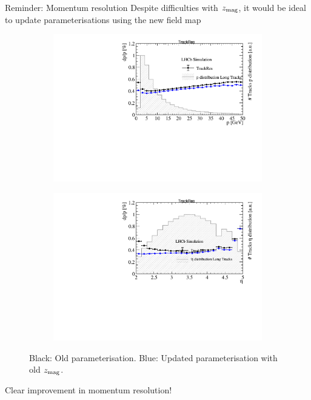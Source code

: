 \documentclass[xcolor={dvipsnames}]{beamer}
\begin{document}
\begin{frame}{Reminder: Momentum resolution}
  \vspace{0.0cm}
  {\Large Despite difficulties with $z_{\rm mag}$, it would be ideal to update parameterisations using the new field map}
  \begin{figure}[htb]
    \centering
    \begin{subfigure}{0.50\textwidth}
      \includegraphics[width=1\textwidth]{Plots/Track_resolution_p_comparison.pdf}
    \end{subfigure}%
    \begin{subfigure}{0.50\textwidth}
      \includegraphics[width=1\textwidth]{Plots/Track_resolution_eta_comparison.pdf}
    \end{subfigure}
    \vspace{-0.2cm}
    \caption*{Black: Old parameterisation. {\color{blue}Blue: Updated parameterisation with old $z_{\rm mag}$}.}
  \end{figure}
  {\Large Clear improvement in momentum resolution!}
\end{frame}
\end{document}

